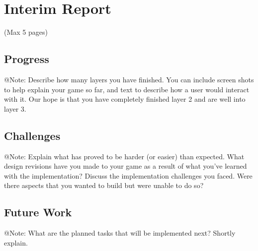\chapter{Interim Report}

\begin{TempText}
	(Max 5 pages)
\end{TempText}


\section{Progress}

\begin{TempText}
	@Note: Describe how many layers you have finished. You can include screen shots to help explain your game so far, and text to describe how a user would interact with it. Our hope is that you have completely finished layer 2 and are well into layer 3.
\end{TempText}


\section{Challenges}

\begin{TempText}
	@Note: Explain what has proved to be harder (or easier) than expected. What design revisions have you made to your game as a result of what you've learned with the implementation? Discuss the implementation challenges you faced. Were there aspects that you wanted to build but were unable to do so?
\end{TempText}


\section{Future Work}

\begin{TempText}
	@Note: What are the planned tasks that will be implemented next? Shortly explain.
\end{TempText}

